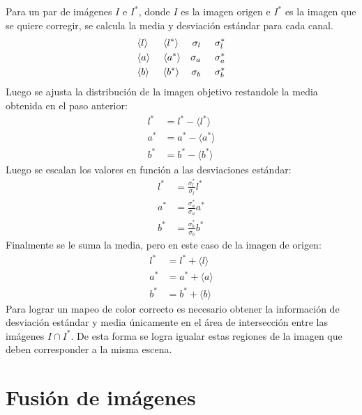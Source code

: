 Para un par de imágenes $I$ e $I^*$, donde $I$ es la imagen origen e $I^*$ es la imagen que se quiere corregir, se calcula la media y desviación estándar para cada canal.
\begin{align*}
&{\langle l \rangle} \hspace{0.55cm} {\langle l^* \rangle}  &{ \sigma_l } \hspace{0.5cm} { \sigma^*_l } \\
&{\langle a \rangle} \hspace{0.48cm} {\langle a^* \rangle}  &{ \sigma_a } \hspace{0.5cm} { \sigma^*_a }  \\
&{\langle b \rangle} \hspace{0.5cm} {\langle b^* \rangle}  &{ \sigma_b } \hspace{0.5cm} { \sigma^*_b } 
\end{align*}
Luego se ajusta la distribución de la imagen objetivo restandole la media obtenida en el paso anterior:
\begin{align*}
l^* &= l^* - \langle l^* \rangle \\
a^* &= a^* - \langle a^* \rangle \\
b^* &= b^* - \langle b^* \rangle
\end{align*}
Luego se escalan los valores en función a las desviaciones estándar:
\begin{align*}
l^* &= \frac{\sigma^*_l}{\sigma_l} l^* \\
a^* &= \frac{\sigma^*_a}{\sigma_a} a^* \\
b^* &= \frac{\sigma^*_b}{\sigma_b} b^*
\end{align*}
Finalmente se le suma la media, pero en este caso de la imagen de origen:
\begin{align*}
l^* &= l^* + \langle l \rangle \\
a^* &= a^* + \langle a \rangle \\
b^* &= b^* + \langle b \rangle
\end{align*}
Para lograr un mapeo de color correcto es necesario obtener la información de desviación estándar y media únicamente en el área de intersección entre las imágenes $I\cap I^*$. De esta forma se logra igualar estas regiones de la imagen que deben corresponder a la misma escena.


\section{Fusión de imágenes}

